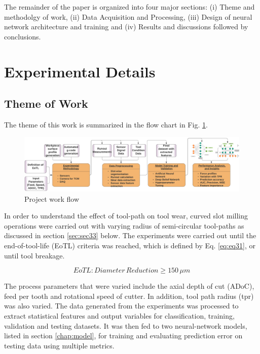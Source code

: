\documentclass[preprint,review,12pt]{elsarticle}
\begin{document}
The remainder of the paper is organized into four major sections: (i) Theme and methodolgy of work, (ii) Data Acquisition and Processing, (iii) Design of neural network architecture and training and (iv) Results and discussions followed by conclusions.


\section{Experimental Details}\label{chap:exp}

\subsection{Theme of Work}\label{sec:sec31}
The theme of this work is summarized in the flow chart in Fig. \ref{fig:fig31}. \par

\begin{figure}[!h]
\begin{center}
\includegraphics[width=\linewidth]{31.png}
\caption{Project work flow}\label{fig:fig31}
\end{center}
\end{figure}

 In order to understand the effect of tool-path on tool wear, curved slot milling operations were carried out with varying radius of semi-circular tool-paths as discussed in section \ref{sec:sec33} below. The experiments were carried out until the end-of-tool-life (EoTL) criteria was reached, which is defined by Eq. \ref{eq:eq31}, or until tool breakage. \par

\begin{equation}
EoTL : Diameter\,Reduction \geq 150\,\mu{m}\label{eq:eq31}
\end{equation}

The process parameters that were varied include the axial depth of cut (ADoC), feed per tooth and rotational speed of cutter. In addition, tool path radius (tpr) was also varied. The data generated from the experiments was processed to extract statistical features and output variables for classification, training, validation and testing datasets. It was then fed to two neural-network models, listed in section \ref{chap:model}, for training and evaluating prediction error on testing data using multiple metrics. \par
\end{document}
